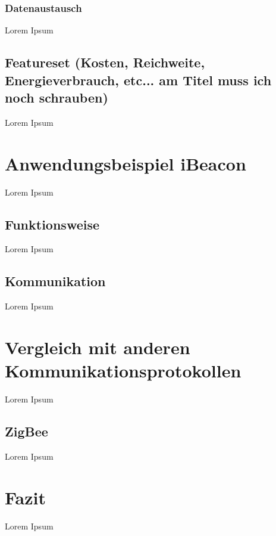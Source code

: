 \subsubsection{Datenaustausch}
\label{sss:funktionsweise:datenaustausch}

Lorem Ipsum

\subsection{Featureset (Kosten, Reichweite, Energieverbrauch, etc... am Titel muss ich noch schrauben)}
\label{ss:funktionsweise:Featureset}

Lorem Ipsum

\section{Anwendungsbeispiel iBeacon}
\label{s:ibeacon}

Lorem Ipsum

\subsection{Funktionsweise}
\label{ss:ibeacon:funktionsweise}

Lorem Ipsum

\subsection{Kommunikation}
\label{ss:ibeacon:kommunikation}

Lorem Ipsum

\section{Vergleich mit anderen Kommunikationsprotokollen}
\label{s:vergleich}

Lorem Ipsum

\subsection{ZigBee}
\label{ss:vergleich:zigbee}

Lorem Ipsum

\section{Fazit}
\label{s:fazit}

Lorem Ipsum
